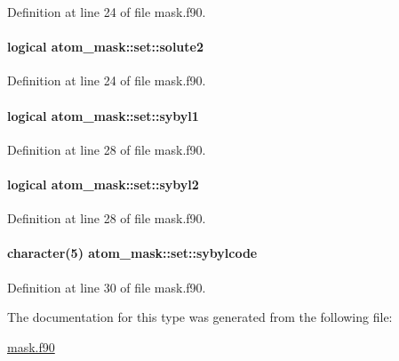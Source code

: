 Definition at line 24 of file mask.\-f90.

\hypertarget{structatom__mask_1_1set_a1df9ca6df28706d84ce78156e149c725}{
\paragraph[{solute2}]{\setlength{\rightskip}{0pt plus 5cm}logical atom\-\_\-mask\-::set\-::solute2\hspace{0.3cm}{\ttfamily [private]}}}\label{structatom__mask_1_1set_a1df9ca6df28706d84ce78156e149c725}


Definition at line 24 of file mask.\-f90.

\hypertarget{structatom__mask_1_1set_a6661bbfb05189a898ca262b17aec8878}{
\paragraph[{sybyl1}]{\setlength{\rightskip}{0pt plus 5cm}logical atom\-\_\-mask\-::set\-::sybyl1\hspace{0.3cm}{\ttfamily [private]}}}\label{structatom__mask_1_1set_a6661bbfb05189a898ca262b17aec8878}


Definition at line 28 of file mask.\-f90.

\hypertarget{structatom__mask_1_1set_a6e2a778a6e01b643842132c78c8388dd}{
\paragraph[{sybyl2}]{\setlength{\rightskip}{0pt plus 5cm}logical atom\-\_\-mask\-::set\-::sybyl2\hspace{0.3cm}{\ttfamily [private]}}}\label{structatom__mask_1_1set_a6e2a778a6e01b643842132c78c8388dd}


Definition at line 28 of file mask.\-f90.

\hypertarget{structatom__mask_1_1set_a9314f05f5b496a619a47be1830866484}{
\paragraph[{sybylcode}]{\setlength{\rightskip}{0pt plus 5cm}character(5) atom\-\_\-mask\-::set\-::sybylcode\hspace{0.3cm}{\ttfamily [private]}}}\label{structatom__mask_1_1set_a9314f05f5b496a619a47be1830866484}


Definition at line 30 of file mask.\-f90.



The documentation for this type was generated from the following file\-:\begin{DoxyCompactItemize}
\item 
\hyperlink{mask_8f90}{mask.\-f90}\end{DoxyCompactItemize}
